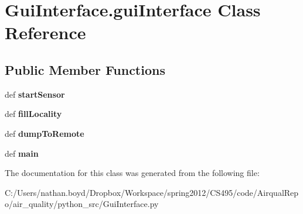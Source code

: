 \hypertarget{class_gui_interface_1_1gui_interface}{\section{Gui\-Interface.\-gui\-Interface Class Reference}
\label{class_gui_interface_1_1gui_interface}
}
\subsection*{Public Member Functions}
\begin{DoxyCompactItemize}
\item 
\hypertarget{class_gui_interface_1_1gui_interface_ac54648b04404d73cdf5cc648cd0df814}{def {\bfseries start\-Sensor}}\label{class_gui_interface_1_1gui_interface_ac54648b04404d73cdf5cc648cd0df814}

\item 
\hypertarget{class_gui_interface_1_1gui_interface_a87f803203fddf02263f7edf07e47097a}{def {\bfseries fill\-Locality}}\label{class_gui_interface_1_1gui_interface_a87f803203fddf02263f7edf07e47097a}

\item 
\hypertarget{class_gui_interface_1_1gui_interface_a64d4c8bc5d86f421303bddf0d12d18f3}{def {\bfseries dump\-To\-Remote}}\label{class_gui_interface_1_1gui_interface_a64d4c8bc5d86f421303bddf0d12d18f3}

\item 
\hypertarget{class_gui_interface_1_1gui_interface_a57f43b82011bb65e63628118e023b748}{def {\bfseries main}}\label{class_gui_interface_1_1gui_interface_a57f43b82011bb65e63628118e023b748}

\end{DoxyCompactItemize}


The documentation for this class was generated from the following file\-:\begin{DoxyCompactItemize}
\item 
C\-:/\-Users/nathan.\-boyd/\-Dropbox/\-Workspace/spring2012/\-C\-S495/code/\-Airqual\-Repo/air\-\_\-quality/python\-\_\-src/Gui\-Interface.\-py\end{DoxyCompactItemize}
